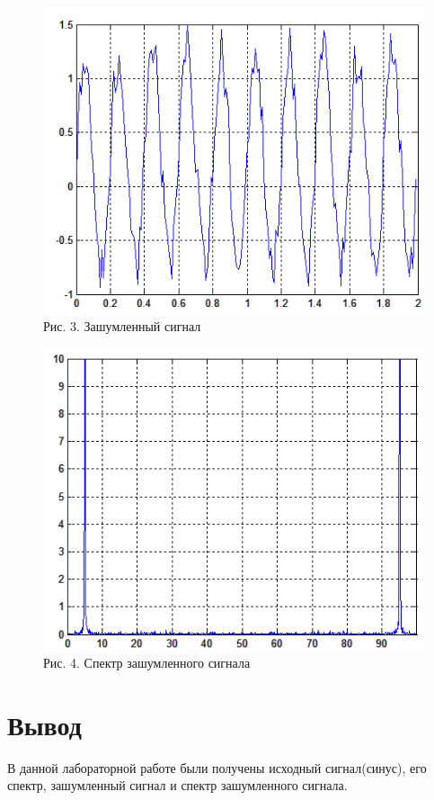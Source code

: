 \documentclass[10pt,a4paper]{report}
\begin{document}
\begin{figure}
\begin{center}
\includegraphics[angle=0, scale = 1]{pic3.png}\newline
Рис. 3. Зашумленный сигнал\newline
\end{center}
\begin{center}
\includegraphics[angle=0, scale = 1]{pic4.png}\newline
Рис. 4. Спектр зашумленного сигнала\newline
\end{center}
\end{figure}
\chapter{Вывод}
В данной лабораторной работе были получены исходный сигнал(синус), его спектр, зашумленный сигнал и спектр зашумленного сигнала. 
\end{document}
